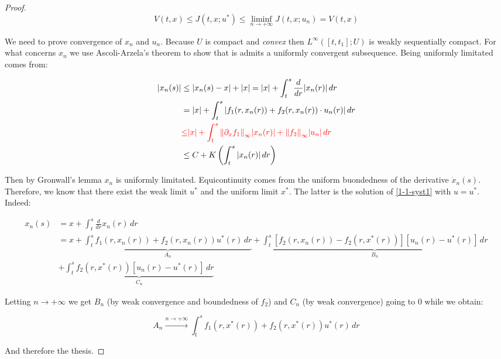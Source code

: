 \begin{theorem}
\begin{proof}
        \[V(t,x)\leq J(t,x;u^{\ast}) \leq \liminf_{n\to+\infty} J(t,x;u_n) = V(t,x)\]

        We need to prove convergence of $x_n$ and $u_n$. Because $U$ is compact and \textit{convex} then $L^{\infty}([t,t_1];U)$ is 
        weakly sequentially compact. For what concerns $x_n$ we use Ascoli-Arzela's theorem to show that is admits a uniformly convergent subsequence. Being 
        uniformly limitated comes from:

        \begin{align}
            \abs{x_n(s)} & \leq \abs{x_n(s)-x}+\abs{x} = \abs{x} + \int_t^s \frac{d}{dr}\abs{x_n(r)} \,dr \\
            & = \abs{x} + \int_t^s \abs{f_1(r,x_n(r)) + f_2(r,x_n(r))\cdot u_n(r)}\,dr \\
            & \color{red}{\leq} \abs{x} + \int_t^s \norm{\partial_xf_1}_{\infty}\abs{x_n(r)} + \norm{f_2}_{\infty}\abs{u_n} \,dr \\
            & \leq C + K\left( \int_t^s \abs{x_n(r)} \,dr \right)   
        \end{align}

        Then by Gronwall's lemma $x_n$ is uniformly limitated. Equicontinuity comes from the uniform buondedness of the
        derivative $\dot{x}_n(s)$. Therefore, we know that there exist the weak limit $u^{\ast}$ and the uniform
        limit $x^{\ast}$. The latter is the solution of \ref{1-1-syst1} with $u=u^{\ast}$. Indeed:

        \begin{align*}
                x_n(s) & = x + \int_t^s\frac{d}{dr}x_n(r) \,dr\\
                & = x + \underbrace{\int_t^sf_1(r,x_n(r)) + f_2(r,x_n(r))u^{\ast}(r) \,dr}_{A_n} + \underbrace{\int_t^s \left[f_2(r,x_n(r)) - f_2(r,x^{\ast}(r))\right]\left[u_n(r)-u^{\ast}(r)\right] \,dr}_{B_n} \\
                & + \underbrace{\int_t^s f_2(r,x^{\ast}(r))\left[u_n(r)-u^{\ast}(r)\right] \,dr}_{C_n}
        \end{align*}
        
        Letting $n\to+\infty$ we get $B_n$ (by weak convergence and boundedness of $f_2$) and $C_n$ (by weak convergence) going to $0$ 
        while we obtain:

        \[A_n\xrightarrow{n\to+\infty}\int_t^sf_1(r,x^{\ast}(r))+f_2(r,x^{\ast}(r))u^{\ast}(r)\,dr\]
        
        And therefore the thesis.
    \end{proof}
\end{theorem}


